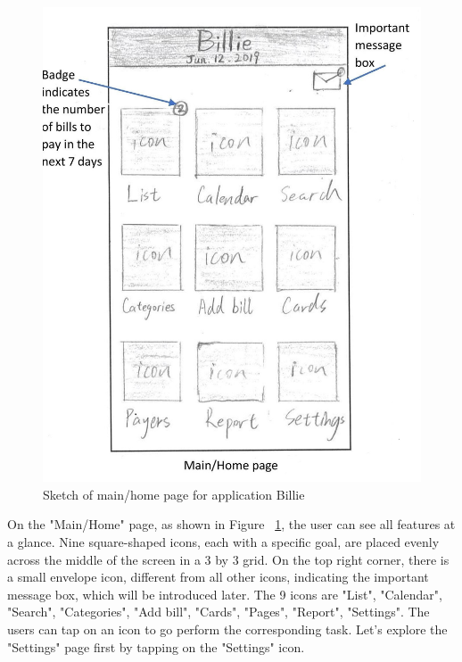 \documentclass{sigchi}
\begin{document}
\begin{figure}[h!]
\centering
  \includegraphics[width=0.6\columnwidth]{4-main-home-page.jpg}
  \caption{Sketch of main/home page for application Billie}
  \label{fig:figure19}
\end{figure}
On the "Main/Home" page, as shown in Figure ~\ref{fig:figure19}, the user can see all features at a glance. Nine square-shaped icons, each with a specific goal, are placed evenly across the middle of the screen in a 3 by 3 grid. On the top right corner, there is a small envelope icon, different from all other icons, indicating the important message box, which will be introduced later. The 9 icons are "List", "Calendar", "Search", "Categories", "Add bill", "Cards", "Pages", "Report", "Settings". The users can tap on an icon to go perform the corresponding task. Let's explore the "Settings" page first by tapping on the "Settings" icon.
\end{document}

